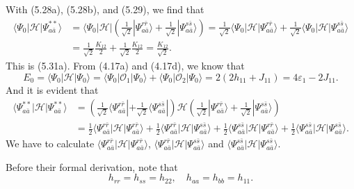 \documentclass[a4paper]{book}
\newcounter{solution}[chapter]
\begin{document}
	\begin{solution}
	With (5.28a), (5.28b), and (5.29), we find that
	\begin{align*}
		\langle \Psi_0 | \mathscr{H} | \Psi^{**}_{a \bar{a}} \rangle &= \langle \Psi_0 | \mathscr{H} | \left( \frac{1}{ \sqrt{2} } | \Psi^{ r \bar{r} }_{ a \bar{a} } \rangle + \frac{1}{ \sqrt{2} } | \Psi^{ s \bar{s} }_{ a \bar{a} } \rangle \right) = \frac{1}{ \sqrt{2} } \langle \Psi_0 | \mathscr{H}  | \Psi^{ r \bar{r} }_{ a \bar{a} } \rangle + \frac{1}{ \sqrt{2} } \langle \Psi_0 | \mathscr{H} | \Psi^{ s \bar{s} }_{ a \bar{a} } \rangle \\
		&= \frac{1}{ \sqrt{2} } \frac{ K_{12} }{2} + \frac{1}{ \sqrt{2} } \frac{ K_{12} }{2} = \frac{ K_{12} }{ \sqrt{2} }.
	\end{align*}
	This is (5.31a). From (4.17a) and (4.17d), we know that
	\[
		E_0 = \langle \Psi_0 | \mathscr{H} | \Psi_0 \rangle = \langle \Psi_0 | \mathscr{O}_1 | \Psi_0 \rangle + \langle \Psi_0 | \mathscr{O}_2 | \Psi_0 \rangle = 2 ( 2 h_{11} + J_{11} ) = 4\varepsilon_1 - 2 J_{11}.
	\]
	And	it is evident that
	\begin{align*}
		\langle \Psi^{**}_{a \bar{a}} | \mathscr{H} | \Psi^{**}_{a \bar{a}} \rangle &= \left( \frac{1}{ \sqrt{2} } \langle  \Psi^{ r \bar{r} }_{ a \bar{a} } | + \frac{1}{ \sqrt{2} } \langle \Psi^{s \bar{s}}_{a \bar{a}} | \right) \mathscr{H} \left( \frac{1}{ \sqrt{2} } | \Psi^{ r \bar{r} }_{ a \bar{a} } \rangle + \frac{1}{ \sqrt{2} } | \Psi^{s \bar{s}}_{a \bar{a}} \rangle \right) \\
		&= \frac{1}{2} \langle \Psi^{r \bar{r}}_{a \bar{a}} | \mathscr{H} | \Psi^{r \bar{r}}_{a \bar{a}} \rangle + \frac{1}{2} \langle \Psi^{r \bar{r}}_{a \bar{a}} | \mathscr{H} | \Psi^{s \bar{s}}_{a \bar{a}} \rangle + \frac{1}{2} \langle \Psi^{s \bar{s}}_{a \bar{a}} | \mathscr{H} | \Psi^{r \bar{r}}_{a \bar{a}} \rangle + \frac{1}{2} \langle \Psi^{s \bar{s}}_{a \bar{a}} | \mathscr{H} | \Psi^{s \bar{s}}_{a \bar{a}} \rangle .
	\end{align*}
	We have to calculate $\langle \Psi^{r \bar{r}}_{a \bar{a}} | \mathscr{H} | \Psi^{r \bar{r}}_{a \bar{a}} \rangle$, $\langle \Psi^{r \bar{r}}_{a \bar{a}} | \mathscr{H} | \Psi^{s \bar{s}}_{a \bar{a}} \rangle$ and $\langle \Psi^{s \bar{s}}_{a \bar{a}} | \mathscr{H} | \Psi^{s \bar{s}}_{a \bar{a}} \rangle$. 
	
	Before their formal derivation, note that
	\[
		h_{rr} = h_{ss} = h_{22} , \quad h_{aa} = h_{bb} = h_{11}.
	\]
	

\end{solution}
\end{document}
